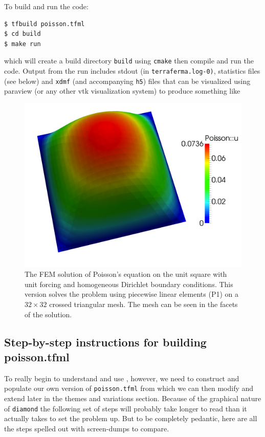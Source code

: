 To build and run the code:
\begin{lstlisting}[style=Bash]
$ tfbuild poisson.tfml
$ cd build
$ make run 
\end{lstlisting}
which will create a build directory \texttt{build} using
\texttt{cmake} then compile and run the code. Output from the run
includes stdout (in \texttt{terraferma.log-0)}, statistics files (see
below) and \texttt{xdmf} (and accompanying \texttt{h5}) files that can be visualized using paraview
(or any other vtk visualization system) to produce something like
\begin{figure}[h]
  \centering
  \includegraphics[width=.8\textwidth]{figures/poisson_simple.png}
  \caption{\protect\small The FEM solution of Poisson's equation on the unit square
    with unit forcing and homogeneous Dirichlet boundary conditions.
    This version solves the problem using piecewise linear elements (P1)
    on a $32\times 32$ crossed triangular mesh. The mesh can be seen
    in the facets of the solution.}
  \label{fig:simple_poisson}
\end{figure}

\subsection{Step-by-step instructions for building poisson.tfml}
\label{sec:step-step-instr}

To really begin to understand and use \TF{}, however, we need to
construct and populate our own version of \texttt{poisson.tfml} from
which we can then modify and extend later in the themes and variations
section.  Because of the graphical nature of \texttt{diamond} the
following set of steps will probably take longer to read than it
actually takes to set the problem up.  But to be completely pedantic,
here are all the steps spelled out with screen-dumps to compare.

